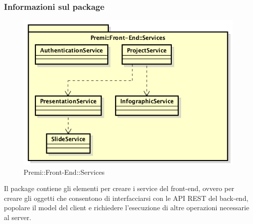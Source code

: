 \subsubsection*{Informazioni sul package}
\begin{figure}[h]
	\centering
	\includegraphics[width=0.9\linewidth]{img/front-end_services}
	\caption[Premi::Front-End::Services]{Premi::Front-End::Services}
\end{figure}
Il package contiene gli elementi per creare i service del \gls{front-end}, ovvero per creare gli oggetti che consentono di interfacciarsi con le API \gls{REST} del \gls{back-end}, popolare il model del client e richiedere l'esecuzione di altre operazioni necessarie al server.

